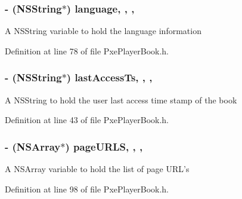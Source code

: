 \hypertarget{interface_pxe_player_book_a2fd2a2d7a8761a35377955b5ef9683eb}{
\subsubsection[{language}]{\setlength{\rightskip}{0pt plus 5cm}-\/ (N\-S\-String$\ast$) language\hspace{0.3cm}{\ttfamily [read]}, {\ttfamily [write]}, {\ttfamily [nonatomic]}, {\ttfamily [strong]}}}\label{interface_pxe_player_book_a2fd2a2d7a8761a35377955b5ef9683eb}
A N\-S\-String variable to hold the language information 

Definition at line 78 of file Pxe\-Player\-Book.\-h.

\hypertarget{interface_pxe_player_book_ae185e74c9aac16d5d592aeba1111defb}{
\subsubsection[{last\-Access\-Ts}]{\setlength{\rightskip}{0pt plus 5cm}-\/ (N\-S\-String$\ast$) last\-Access\-Ts\hspace{0.3cm}{\ttfamily [read]}, {\ttfamily [write]}, {\ttfamily [nonatomic]}, {\ttfamily [strong]}}}\label{interface_pxe_player_book_ae185e74c9aac16d5d592aeba1111defb}
A N\-S\-String to hold the user last access time stamp of the book 

Definition at line 43 of file Pxe\-Player\-Book.\-h.

\hypertarget{interface_pxe_player_book_a36d7ed8749aa6ab03a805aed527811aa}{
\subsubsection[{page\-U\-R\-L\-S}]{\setlength{\rightskip}{0pt plus 5cm}-\/ (N\-S\-Array$\ast$) page\-U\-R\-L\-S\hspace{0.3cm}{\ttfamily [read]}, {\ttfamily [write]}, {\ttfamily [nonatomic]}, {\ttfamily [strong]}}}\label{interface_pxe_player_book_a36d7ed8749aa6ab03a805aed527811aa}
A N\-S\-Array variable to hold the list of page U\-R\-L's 

Definition at line 98 of file Pxe\-Player\-Book.\-h.

